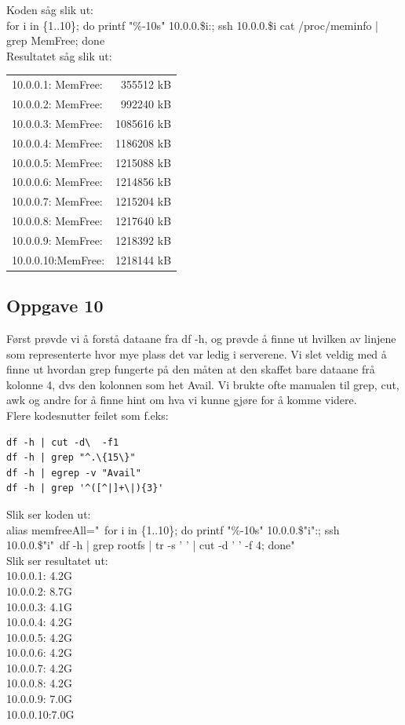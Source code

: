 \documentclass[a4paper, norsk, 12pt]{article}
\begin{document}
Koden såg slik ut:\\
for i in \{1..10\}; do printf "\%-10s" 10.0.0.\$i:; ssh 10.0.0.\$i cat /proc/meminfo | grep MemFree; done\\

Resultatet såg slik ut:\\
\begin{tabular}{lr}
10.0.0.1: MemFree: &         355512 kB\\
10.0.0.2: MemFree: &         992240 kB\\
10.0.0.3: MemFree: &        1085616 kB\\
10.0.0.4: MemFree: &        1186208 kB\\
10.0.0.5: MemFree: &        1215088 kB\\
10.0.0.6: MemFree: &        1214856 kB\\
10.0.0.7: MemFree: &        1215204 kB\\
10.0.0.8: MemFree: &        1217640 kB\\
10.0.0.9: MemFree: &        1218392 kB\\
10.0.0.10:MemFree: &        1218144 kB
\end{tabular}

\subsection{Oppgave 10}
Først prøvde vi å forstå dataane fra df -h, og prøvde å finne ut hvilken av linjene som representerte hvor mye plass det var ledig i serverene. Vi slet veldig med å finne ut hvordan grep fungerte på den måten at den skaffet bare dataane frå kolonne 4, dvs den kolonnen som het Avail. Vi brukte ofte manualen til grep, cut, awk og andre for å finne hint om hva vi kunne gjøre for å komme videre.\\

Flere kodesnutter feilet som f.eks:\\
\begin{verbatim}
df -h | cut -d\  -f1
df -h | grep "^.\{15\}"
df -h | egrep -v "Avail"
df -h | grep '^([^|]+\|){3}'
\end{verbatim}

Slik ser koden ut:\\
alias memfreeAll="\ for i in \{1..10\}; do printf "\%-10s" 10.0.0.\$"i":; ssh 10.0.0.\$"i"\ df -h | grep rootfs | tr -s ' ' | cut -d ' ' -f 4; done"\\

Slik ser resultatet ut:\\
10.0.0.1: 4.2G\\
10.0.0.2: 8.7G\\
10.0.0.3: 4.1G\\
10.0.0.4: 4.2G\\
10.0.0.5: 4.2G\\
10.0.0.6: 4.2G\\
10.0.0.7: 4.2G\\
10.0.0.8: 4.2G\\
10.0.0.9: 7.0G\\
10.0.0.10:7.0G
\end{document}
